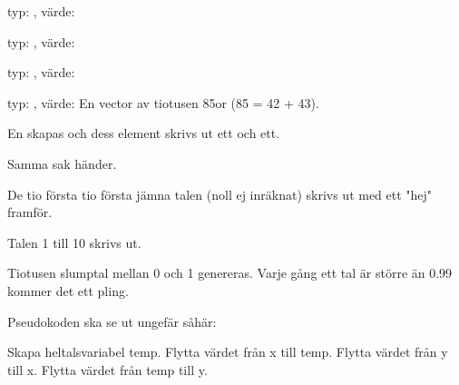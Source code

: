 \Subtask typ: , värde: 

\Subtask typ: , värde: 

\Subtask typ: , värde: 

\Subtask typ: , värde: En vector av tiotusen 85or (85 = 42 + 43).

\Task 

\Subtask En  skapas och dess element skrivs ut ett och ett.

\Subtask Samma sak händer.

\Subtask De tio första tio första jämna talen (noll ej inräknat) skrivs ut med ett "hej" framför.

\Subtask Talen 1 till 10 skrivs ut.

\Subtask Tiotusen slumptal mellan 0 och 1 genereras. Varje gång ett tal är större än 0.99 kommer det ett pling.

\Task 

\Subtask Pseudokoden ska se ut ungefär såhär:

Skapa heltalsvariabel temp. 
Flytta värdet från x till temp. 
Flytta värdet från y till x. 
Flytta värdet från temp till y.

